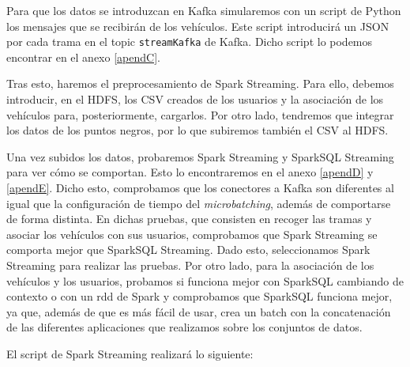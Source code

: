 Para que los datos se introduzcan en Kafka simularemos con un script de
Python los mensajes que se recibirán de los vehículos. Este script
introducirá un JSON por cada trama en el topic {\tt streamKafka} de Kafka.
Dicho script lo podemos encontrar en el anexo \ref{apendC}.

Tras esto, haremos el preprocesamiento de Spark Streaming. Para ello,
debemos introducir, en el HDFS, los CSV creados de los usuarios y la
asociación de los vehículos para, posteriormente, cargarlos. Por otro lado,
tendremos que integrar los datos de los puntos negros, por lo que subiremos
también el CSV al HDFS.

Una vez subidos los datos, probaremos Spark Streaming y SparkSQL Streaming
para ver cómo se comportan. Esto lo encontraremos en el anexo \ref{apendD}
y \ref{apendE}. Dicho esto, comprobamos que los conectores a Kafka son
diferentes al igual que la configuración de tiempo del {\em microbatching},
además de comportarse de forma distinta. En dichas pruebas, que consisten
en recoger las tramas y asociar los vehículos con sus usuarios, comprobamos
que Spark Streaming se comporta mejor que SparkSQL Streaming. Dado esto,
seleccionamos Spark Streaming para realizar las pruebas. Por otro lado,
para la asociación de los vehículos y los usuarios, probamos si funciona
mejor con SparkSQL cambiando de contexto o con un rdd de Spark y
comprobamos que SparkSQL funciona mejor, ya que, además de que es más fácil
de usar, crea un batch con la concatenación de las diferentes aplicaciones
que realizamos sobre los conjuntos de datos.

El script de Spark Streaming realizará lo siguiente:

